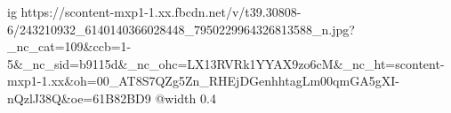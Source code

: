  
 
 
 
 

\ifcmt
  ig https://scontent-mxp1-1.xx.fbcdn.net/v/t39.30808-6/243210932_6140140366028448_7950229964326813588_n.jpg?_nc_cat=109&ccb=1-5&_nc_sid=b9115d&_nc_ohc=LX13RVRk1YYAX9zo6cM&_nc_ht=scontent-mxp1-1.xx&oh=00_AT8S7QZg5Zn_RHEjDGenhhtagLm00qmGA5gXI-nQzlJ38Q&oe=61B82BD9
  @width 0.4
\fi
